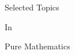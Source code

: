 \documentclass[]{article}
\begin{document}
\begingroup
{}
\thispagestyle{empty}
\color{cover}
\begin{center}
    \vspace*{1.5cm}
    {\fontsize{50pt}{30pt}\selectfont\Acmefont
        Selected Topics\par
        In\par
        Pure Mathematics
    }
\end{center}
\endgroup
\end{document}
